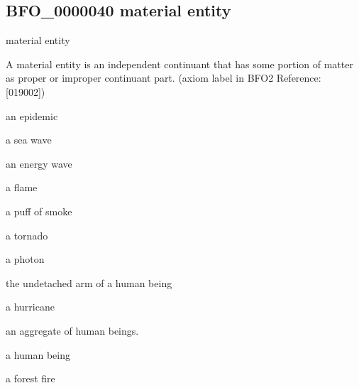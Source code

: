 \documentclass[letterpaper,10pt,english]{sphinxmanual}
\begin{document}
\begin{sphinxShadowBox}

\sphinxAtStartPar
{}
\end{sphinxShadowBox}
\begin{quote}

\ignorespaces \end{quote}


\subsection{BFO\_0000040 \sphinxhyphen{} material entity}
\label{\detokenize{doc-BFO_0000040:bfo-0000040-material-entity}}\label{\detokenize{doc-BFO_0000040:index-0}}\label{\detokenize{doc-BFO_0000040::doc}}
\begin{sphinxShadowBox}

\sphinxAtStartPar
material entity
\end{sphinxShadowBox}

\begin{sphinxShadowBox}

\sphinxAtStartPar
{\hyperref[\detokenize{doc-BFO_0000004::doc}]{}}
\end{sphinxShadowBox}

\begin{sphinxShadowBox}

\sphinxAtStartPar
A material entity is an independent continuant that has some portion of matter as proper or improper continuant part. (axiom label in BFO2 Reference: {[}019\sphinxhyphen{}002{]})
\end{sphinxShadowBox}

\begin{sphinxShadowBox}

\sphinxAtStartPar
an epidemic

\sphinxAtStartPar
a sea wave

\sphinxAtStartPar
an energy wave

\sphinxAtStartPar
a flame

\sphinxAtStartPar
a puff of smoke

\sphinxAtStartPar
a tornado

\sphinxAtStartPar
a photon

\sphinxAtStartPar
the undetached arm of a human being

\sphinxAtStartPar
a hurricane

\sphinxAtStartPar
an aggregate of human beings.

\sphinxAtStartPar
a human being

\sphinxAtStartPar
a forest fire
\end{sphinxShadowBox}
\end{document}
